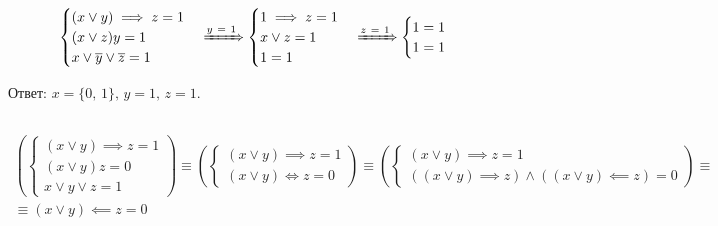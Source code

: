 \documentclass[12pt,a4paper]{article}
\theoremstyle{plain}
\theoremstyle{definition}
\theoremstyle{remark}
\numberwithin{equation}{section}
\begin{document}
\subsection{}
  \begin{equation*}
    \begin{aligned}
    \begin{cases}
      (x \lor y) \implies z = 1 \\
      (x \lor z)y = 1 \\
      x \lor \overline y \lor \overline z = 1
    \end{cases} 
    \xRightarrow{y\ =\ 1}
    \begin{cases}
      1 \implies z = 1 \\
      x \lor z = 1 \\
      1 = 1
    \end{cases}
    \xRightarrow{z\ =\ 1}
    \begin{cases}
      1 = 1 \\
      1 = 1 \\
    \end{cases}
    \end{aligned}
  \end{equation*}

\noindent Ответ: $x=\{0,\,1\},\,y=1,\,z=1$. 

\subsection{}
  \begin{equation*}
    \begin{aligned}
      \left(\begin{cases}
        (x \lor y) \implies z = 1 \\
        (x \lor y)z = 0 \\
        x \lor y \lor z = 1
      \end{cases}\right)
      \equiv
      \left(\begin{cases}
        (x \lor y) \implies z = 1 \\
        (x \lor y) \iff z = 0
      \end{cases}\right)
      \equiv
      \left(\begin{cases}
        (x \lor y) \implies z = 1 \\
        ((x \lor y) \implies z) \land ((x \lor y) \impliedby z) = 0   
      \end{cases}\right) 
      \equiv \\ \equiv
      (x \lor y) \impliedby z = 0
    \end{aligned}
  \end{equation*}
\end{document}
